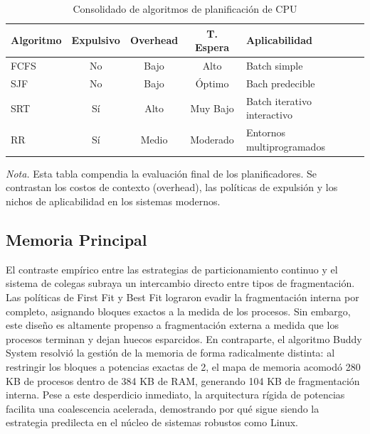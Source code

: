 \documentclass[12pt,a4paper]{article}
\begin{document}
\begin{table}[H]
\centering\small
\caption{Consolidado de algoritmos de planificación de CPU}
\label{tab:comp_cpu}
\begin{tabularx}{\textwidth}{X c c c X}
\toprule
\textbf{Algoritmo} & \textbf{Expulsivo} & \textbf{Overhead} & \textbf{T. Espera} & \textbf{Aplicabilidad} \\
\midrule
FCFS & No & Bajo & Alto & Batch simple \\
SJF & No & Bajo & Óptimo & Bach predecible \\
SRT & Sí & Alto & Muy Bajo & Batch iterativo interactivo \\
RR & Sí & Medio & Moderado & Entornos multiprogramados \\
\bottomrule
\end{tabularx}
    \par\vspace{0.2cm}\raggedright \textit{Nota.} Esta tabla compendia la evaluación final de los planificadores. Se contrastan los costos de contexto (overhead), las políticas de expulsión y los nichos de aplicabilidad en los sistemas modernos.
\end{table}

\subsection{Memoria Principal}
El contraste empírico entre las estrategias de particionamiento continuo y el sistema de colegas subraya un intercambio directo entre tipos de fragmentación. Las políticas de First Fit y Best Fit lograron evadir la fragmentación interna por completo, asignando bloques exactos a la medida de los procesos. Sin embargo, este diseño es altamente propenso a fragmentación externa a medida que los procesos terminan y dejan huecos esparcidos. En contraparte, el algoritmo Buddy System resolvió la gestión de la memoria de forma radicalmente distinta: al restringir los bloques a potencias exactas de 2, el mapa de memoria acomodó 280 KB de procesos dentro de 384 KB de RAM, generando 104 KB de fragmentación interna. Pese a este desperdicio inmediato, la arquitectura rígida de potencias facilita una coalescencia acelerada, demostrando por qué sigue siendo la estrategia predilecta en el núcleo de sistemas robustos como Linux.
\end{document}
